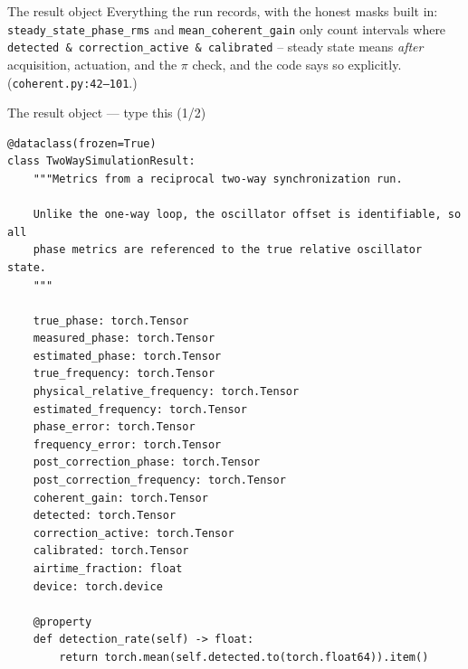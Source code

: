 \documentclass[10pt]{beamer}
\begin{document}
\begin{frame}{The result object}
  Everything the run records, with the honest masks built in:
  \texttt{steady\_state\_phase\_rms} and
  \texttt{mean\_coherent\_gain} only count intervals where
  \texttt{detected \& correction\_active \& calibrated} --
  steady state means \emph{after} acquisition, actuation, and
  the $\pi$ check, and the code says so explicitly.
  (\texttt{coherent.py:42--101}.)
\end{frame}

\begin{frame}[fragile]{The result object --- type this (1/2)}
\begin{lstlisting}[basicstyle=\ttfamily\tiny]
@dataclass(frozen=True)
class TwoWaySimulationResult:
    """Metrics from a reciprocal two-way synchronization run.

    Unlike the one-way loop, the oscillator offset is identifiable, so all
    phase metrics are referenced to the true relative oscillator state.
    """

    true_phase: torch.Tensor
    measured_phase: torch.Tensor
    estimated_phase: torch.Tensor
    true_frequency: torch.Tensor
    physical_relative_frequency: torch.Tensor
    estimated_frequency: torch.Tensor
    phase_error: torch.Tensor
    frequency_error: torch.Tensor
    post_correction_phase: torch.Tensor
    post_correction_frequency: torch.Tensor
    coherent_gain: torch.Tensor
    detected: torch.Tensor
    correction_active: torch.Tensor
    calibrated: torch.Tensor
    airtime_fraction: float
    device: torch.device

    @property
    def detection_rate(self) -> float:
        return torch.mean(self.detected.to(torch.float64)).item()
\end{lstlisting}
\end{frame}
\end{document}
